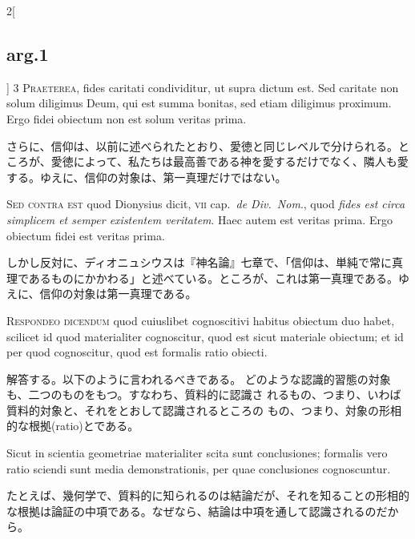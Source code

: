 \documentclass[paper=a4paper,fontsize=10pt,jafontsize=9pt,titlepage]{jlreq}
\begin{document}
\begin{paracol}{2}[\subsection{arg.1}]
{\scshape 3 Praeterea}, fides caritati
condividitur, ut supra dictum est. Sed caritate non solum diligimus
Deum, qui est summa bonitas, sed etiam diligimus proximum. Ergo fidei
obiectum non est solum veritas prima.

\switchcolumn

さらに、信仰は、以前に述べられたとおり、愛徳と同じレベルで分けられる。と
ころが、愛徳によって、私たちは最高善である神を愛するだけでなく、隣人も愛
する。ゆえに、信仰の対象は、第一真理だけではない。

\switchcolumn*[\subsection{s.c.}]

{\scshape Sed contra est} quod Dionysius dicit, {\scshape vii} cap.~{\itshape de
Div.~Nom}., quod {\itshape fides est circa simplicem et semper
existentem veritatem}. Haec autem est veritas prima. Ergo obiectum fidei
est veritas prima.

\switchcolumn

しかし反対に、ディオニュシウスは『神名論』七章で、「信仰は、単純で常に真
理であるものにかかわる」と述べている。ところが、これは第一真理である。ゆ
えに、信仰の対象は第一真理である。


{\scshape Respondeo dicendum} quod cuiuslibet
cognoscitivi habitus obiectum duo habet, scilicet id quod materialiter
cognoscitur, quod est sicut materiale obiectum; et id per quod
cognoscitur, quod est formalis ratio obiecti.

\switchcolumn

解答する。以下のように言われるべきである。
どのような認識的習態の対象も、二つのものをもつ。すなわち、質料的に認識さ
 れるもの、つまり、いわば質料的対象と、それをとおして認識されるところの
 もの、つまり、対象の形相的な根拠(ratio)とである。

\switchcolumn*

Sicut in scientia
geometriae materialiter scita sunt conclusiones; formalis vero ratio
sciendi sunt media demonstrationis, per quae conclusiones
cognoscuntur.

\switchcolumn

たとえば、幾何学で、質料的に知られるのは結論だが、それを知ることの形相的
な根拠は論証の中項である。なぜなら、結論は中項を通して認識されるのだか
ら。


\end{paracol}
\end{document}
